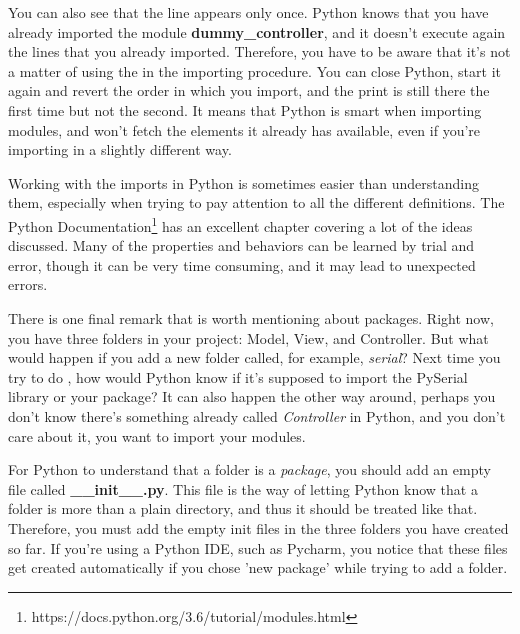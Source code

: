 \sloppy You can also see that the line  appears only once. Python knows that you have already imported the module \textbf{dummy\_controller}, and it doesn't execute again the lines that you already imported. Therefore, you have to be aware that it's not a matter of using the  in the importing procedure. You can close Python, start it again and revert the order in which you import, and the print is still there the first time but not the second. It means that Python is smart when importing modules, and won't fetch the elements it already has available, even if you're importing in a slightly different way.


Working with the imports in Python is sometimes easier than understanding them, especially when trying to pay attention to all the different definitions. The Python Documentation\footnote{https://docs.python.org/3.6/tutorial/modules.html} has an excellent chapter covering a lot of the ideas discussed. Many of the properties and behaviors can be learned by trial and error, though it can be very time consuming, and it may lead to unexpected errors.

There is one final remark that is worth mentioning about packages. Right now, you have three folders in your project: Model, View, and Controller. But what would happen if you add a new folder called, for example, \emph{serial}? Next time you try to do , how would Python know if it's supposed to import the PySerial library or your package? It can also happen the other way around, perhaps you don't know there's something already called \emph{Controller} in Python, and you don't care about it, you want to import your modules.

For Python to understand that a folder is a \emph{package}, you should add an empty file called \textbf{\_\_init\_\_.py}. This file is the way of letting Python know that a folder is more than a plain directory, and thus it should be treated like that. Therefore, you must add the empty init files in the three folders you have created so far. If you're using a Python IDE, such as Pycharm, you notice that these files get created automatically if you chose 'new package' while trying to add a folder.

